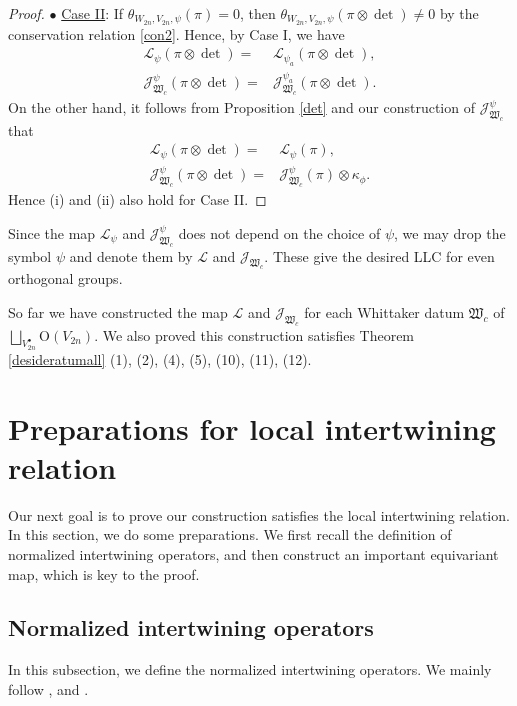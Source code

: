 \documentclass[article]{article}
\numberwithin{equation}{section}
\theoremstyle{definition}
\begin{document}
\begin{proof}
		
$\bullet$ \underline{Case II}:  If $\theta_{W_{2n}, V_{2n}, \psi}(\pi)=0$, then $\theta_{W_{2n}, V_{2n}, \psi}(\pi\otimes\det)\neq 0$ by the conservation relation \ref{con2}. Hence, by Case I, we have 
	\begin{align*}
	\mathcal L_{\psi}(\pi\otimes\det)=&\mathcal L_{\psi_a}(\pi\otimes\det),\\
	\mathcal J^{\psi}_{\mathfrak W_{c}}(\pi\otimes\det)=&\mathcal J^{\psi_a}_{\mathfrak W_{c}}(\pi\otimes\det) .
	\end{align*}
On the other hand, it follows from Proposition \ref{det} and our construction of $\mathcal J^{\psi}_{\mathfrak W_{c}}$ that 
\begin{align*}
	\mathcal L_\psi(\pi\otimes\det)=&\mathcal L_\psi(\pi),\\
	\mathcal J^\psi_{\mathfrak W_{c}}(\pi\otimes\det)=& \mathcal J^\psi_{\mathfrak W_c}(\pi)\otimes\kappa_{\phi}. 	
\end{align*}	
Hence (i) and (ii) also hold for Case II. 	
\end{proof}

Since the map $\mathcal L_\psi$ and $\mathcal J^\psi_{\mathfrak W_{c}}$ does not depend on the choice of $\psi$, we may drop the symbol $\psi$ and denote them by $\mathcal L$ and $\mathcal J_{\mathfrak W_{c}}$. These give the desired LLC for even orthogonal groups. 


So far we have constructed the map $\mathcal L$ and $\mathcal J_{\mathfrak W_{c}}$ for each Whittaker datum $\mathfrak W_{c}$ of $\bigsqcup_{V_{2n}^{\bullet}}\mathrm O(V_{2n})$. We also proved this construction satisfies Theorem \ref{desideratumall} (1), (2), (4), (5), (10), (11), (12). 
 








\section{Preparations for local intertwining relation }\label{LIR}
Our next goal is to prove our construction satisfies the local intertwining relation. In this section, we do some preparations. We first recall the definition of normalized intertwining operators, and then construct an important equivariant map, which is key to the proof.  
 

\subsection{Normalized intertwining operators}\label{normalizingintertwing}
In this subsection, we define the normalized intertwining operators. We mainly follow \cite{MR3135650}, \cite{MR3708200} and \cite{MR3788848}.
\end{document}
